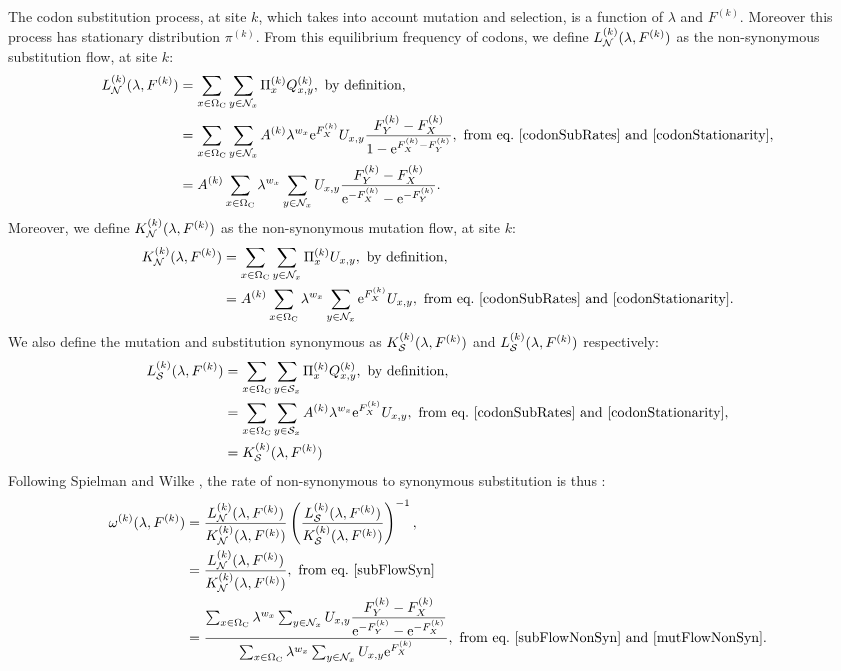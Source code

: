 The codon substitution process, at site $k$, which takes into account mutation and selection, is a function of $\lambda$ and $F^{(k)}$. Moreover this process has stationary distribution $\pi^{(k)}$. From this equilibrium frequency of codons, we define $L_{\mathcal{N}}^{(k)}(\lambda, F^{(k)})$ as the non-synonymous substitution flow, at site $k$:
\begin{align}
L_{\NonSyn}^{(k)}(\lambda, F^{(k)})
& =  \sum_{x \in \SetCodon} \sum_{y \in \NxNonSyn} \Pi_x^{(k)} Q_{x, y}^{(k)}, \ \textrm{by definition},\\
& =\sum_{x \in \SetCodon} \sum_{y \in \NxNonSyn} A^{(k)} \lambda^{w_x} \e^{F_X^{(k)}} U_{x, y} \dfrac{F_Y^{(k)} - F_X^{(k)}}{1 - \e^{F_X^{(k)} - F_Y^{(k)}}}, \ \textrm{from eq.}\ \ref{codonSubRates} \ \text{and} \ \ref{codonStationarity},\\
& =A^{(k)} \sum_{x \in \SetCodon} \lambda^{w_x} \sum_{y \in \NxNonSyn}  U_{x, y} \dfrac{F_Y^{(k)} - F_X^{(k)}}{\e^{-F_X^{(k)}} - \e^{ - F_Y^{(k)}}}.
\label{subFlowNonSyn}
\end{align}
Moreover, we define $K_{\mathcal{N}}^{(k)}(\lambda, F^{(k)})$ as the non-synonymous mutation flow, at site $k$:
\begin{align}
K_{\NonSyn}^{(k)}(\lambda, F^{(k)})
& =  \sum_{x \in \SetCodon} \sum_{y \in \NxNonSyn} \Pi_x^{(k)} U_{x, y}, \ \textrm{by definition},\\
& = A^{(k)}  \sum_{x \in \SetCodon} \lambda^{w_x} \sum_{y \in \NxNonSyn} \e^{F_X^{(k)}} U_{x, y}, \ \textrm{from eq.}\ \ref{codonSubRates} \ \text{and} \ \ref{codonStationarity}.
\label{mutFlowNonSyn}
\end{align}
We also define the mutation and substitution synonymous as $K_{\mathcal{S}}^{(k)}(\lambda, F^{(k)})$ and $L_{\mathcal{S}}^{(k)}(\lambda, F^{(k)})$ respectively:
\begin{align}
L_{\Syn}^{(k)}(\lambda, F^{(k)})
& =  \sum_{x \in \SetCodon} \sum_{y \in \NxSyn} \Pi_x^{(k)} Q_{x, y}^{(k)}, \ \textrm{by definition},\\
& =\sum_{x \in \SetCodon} \sum_{y \in \NxSyn} A^{(k)} \lambda^{w_x} \e^{F_X^{(k)}} U_{x, y}, \ \textrm{from eq.}\ \ref{codonSubRates} \ \text{and} \ \ref{codonStationarity}, \\
& =K_{\Syn}^{(k)}(\lambda, F^{(k)})
\label{subFlowSyn}
\end{align}
Following Spielman and Wilke \citep{Spielman2015}, the rate of non-synonymous to synonymous substitution is thus :
\begin{align}
\omega^{(k)}(\lambda, F^{(k)})
& =\dfrac{L_{\NonSyn}^{(k)}(\lambda, F^{(k)})}{K_{\NonSyn}^{(k)}(\lambda, F^{(k)})}  \left( \dfrac{L_{\Syn}^{(k)}(\lambda, F^{(k)})}{K_{\Syn}^{(k)}(\lambda, F^{(k)})}  \right)^{-1}, \\
& =\dfrac{L_{\NonSyn}^{(k)}(\lambda, F^{(k)})}{K_{\NonSyn}^{(k)}(\lambda, F^{(k)})}, \ \textrm{from eq.}\ \ref{subFlowSyn} \\
& =\dfrac{ \sum_{x \in \SetCodon} \lambda^{w_x} \sum_{y \in \NxNonSyn}  U_{x, y} \dfrac{F_Y^{(k)} - F_X^{(k)}}{\e^{ - F_Y^{(k)}} -  \e^{- F_X^{(k)}} } }{ \sum_{x \in \SetCodon}  \lambda^{w_x} \sum_{y \in \NxNonSyn} U_{x, y} \e^{F_X^{(k)}} }, \ \textrm{from eq.}\ \ref{subFlowNonSyn} \ \text{and} \ \ref{mutFlowNonSyn}.
\label{omegaSite}
\end{align}
